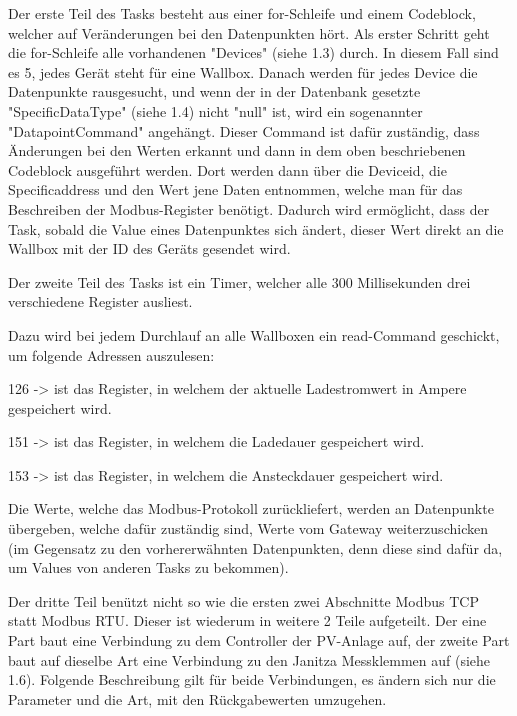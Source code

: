 Der erste Teil des Tasks besteht aus einer for-Schleife und einem Codeblock, welcher auf Veränderungen bei den Datenpunkten hört. Als erster Schritt geht die for-Schleife alle vorhandenen "Devices" (siehe 1.3) durch. In diesem Fall sind es 5, jedes Gerät steht für eine Wallbox. Danach werden für jedes Device die Datenpunkte rausgesucht, und wenn der in der Datenbank gesetzte "SpecificDataType" (siehe 1.4) nicht "null" ist, wird ein sogenannter "DatapointCommand" angehängt. Dieser Command ist dafür zuständig, dass Änderungen bei den Werten erkannt und dann in dem oben beschriebenen Codeblock ausgeführt werden. Dort werden dann über die Deviceid, die Specificaddress und den Wert jene Daten entnommen, welche man für das Beschreiben der Modbus-Register benötigt. Dadurch wird ermöglicht, dass der Task, sobald die Value eines Datenpunktes sich ändert, dieser Wert direkt an die Wallbox mit der ID des Geräts gesendet wird.  

Der zweite Teil des Tasks ist ein Timer, welcher alle 300 Millisekunden drei verschiedene Register ausliest.  

Dazu wird bei jedem Durchlauf an alle Wallboxen ein read-Command geschickt, um folgende Adressen auszulesen:  

\begin{compactitem}
  \item 126 -> ist das Register, in welchem der aktuelle Ladestromwert in Ampere gespeichert wird. 
  \item 151 -> ist das Register, in welchem die Ladedauer gespeichert wird.
  \item 153 -> ist das Register, in welchem die Ansteckdauer gespeichert wird.  
\end{compactitem}

 

Die Werte, welche das Modbus-Protokoll zurückliefert, werden an Datenpunkte übergeben, welche dafür zuständig sind, Werte vom Gateway weiterzuschicken (im Gegensatz zu den vorhererwähnten Datenpunkten, denn diese sind dafür da, um Values von anderen Tasks zu bekommen).  

Der dritte Teil benützt nicht so wie die ersten zwei Abschnitte Modbus TCP statt Modbus RTU. Dieser ist wiederum in weitere 2 Teile aufgeteilt. Der eine Part baut eine Verbindung zu dem Controller der PV-Anlage auf, der zweite Part baut auf dieselbe Art eine Verbindung zu den Janitza Messklemmen auf (siehe 1.6). Folgende Beschreibung gilt für beide Verbindungen, es ändern sich nur die Parameter und die Art, mit den Rückgabewerten umzugehen.  

